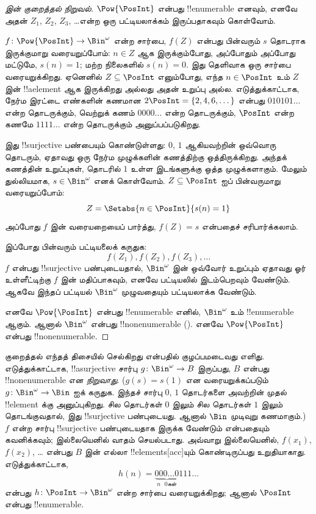 \documentclass[../../../include/open-logic-section]{subfiles}
\begin{document}
\begin{proof}[{} இன் குறைத்தல் நிறுவல்]
$\Pow{\PosInt}$ என்பது !!{enumerable} எனவும், எனவே அதன்
$Z_{1}$, $Z_{2}$, $Z_{3}$, \dots என்ற ஒரு பட்டியலாக்கம்
இருப்பதாகவும் கொள்வோம்.

$f \colon \Pow{\PosInt} \to \Bin^\omega$ என்ற சார்பை,
$f(Z)$ என்பது பின்வரும் $s$ தொடராக இருக்குமாறு வரையறுப்போம்:
$n \in Z$ ஆக இருக்கும்போது, அப்போதும் அப்போது மட்டுமே,
$s(n) = 1$; மற்ற நிலைகளில் $s(n) = 0$.
இது தெளிவாக ஒரு சார்பை வரையறுக்கிறது.
ஏனெனில் $Z \subseteq \PosInt$ எனும்போது,
எந்த $n \in \PosInt$ உம் $Z$ இன் !!a{element} ஆக இருக்கிறது
அல்லது அதன் உறுப்பு அல்ல.
எடுத்துக்காட்டாக, நேர்ம இரட்டை எண்களின் கணமான
$2\PosInt = \{2,
4, 6, \dots\}$ என்பது $010101\dots$ என்ற தொடருக்கும்,
வெற்றுக் கணம் $0000\dots$ என்ற தொடருக்கும்,
$\PosInt$ என்ற கணமே $1111\dots$ என்ற தொடருக்கும் அனுப்பப்படுகிறது.

இது !!{surjective} பண்பையும் கொண்டுள்ளது:
$0$, $1$ ஆகியவற்றின் ஒவ்வொரு தொடரும், ஏதாவது ஒரு நேர்ம முழுக்களின்
கணத்திற்கு ஒத்திருக்கிறது.
அந்தக் கணத்தின் உறுப்புகள், தொடரில் $1$ உள்ள இடங்களுக்கு
ஒத்த முழுக்களாகும்.
மேலும் துல்லியமாக, $s \in \Bin^\omega$ எனக் கொள்வோம்.
$Z \subseteq \PosInt$ ஐப் பின்வருமாறு வரையறுப்போம்:
\[
Z = \Setabs{n \in \PosInt}{s(n) = 1}
\]
அப்போது $f$ இன் வரையறையைப் பார்த்து,
$f(Z) = s$ என்பதைச் சரிபார்க்கலாம்.

இப்போது பின்வரும் பட்டியலைக் கருதுக:
\[
f(Z_1), f(Z_2), f(Z_3), \dots
\]
$f$ என்பது !!{surjective} பண்புடையதால்,
$\Bin^\omega$ இன் ஒவ்வோர் உறுப்பும் ஏதாவது ஓர் உள்ளீட்டிற்கு
$f$ இன் மதிப்பாகவும், எனவே பட்டியலில் இடம்பெறவும் வேண்டும்.
ஆகவே இந்தப் பட்டியல் $\Bin^\omega$ முழுவதையும் பட்டியலாக்க வேண்டும்.

எனவே $\Pow{\PosInt}$ என்பது !!{enumerable} எனில்,
$\Bin^\omega$ உம் !!{enumerable} ஆகும்.
ஆனால் $\Bin^\omega$ என்பது !!{nonenumerable}
().
எனவே $\Pow{\PosInt}$ என்பது !!{nonenumerable}.
\end{proof}

\begin{explain}
குறைத்தல் எந்தத் திசையில் செல்கிறது என்பதில் குழப்பமடைவது எளிது.
எடுத்துக்காட்டாக, !!a{surjective} சார்பு
$g \colon \Bin^\omega \to B$ இருப்பது,
$B$ என்பது !!{nonenumerable} என \emph{நிறுவாது}.
($g(s) = s(1)$ என வரையறுக்கப்படும்
$g \colon \Bin^\omega \to \Bin$ ஐக் கருதுக.
இந்தச் சார்பு $0$, $1$ தொடர்களை அவற்றின் முதல் !!{element} க்கு
அனுப்புகிறது.
சில தொடர்கள் $0$ இலும் சில தொடர்கள் $1$ இலும் தொடங்குவதால்,
இது !!{surjective} பண்புடையது.
ஆனால் $\Bin$ முடிவுறு கணமாகும்.)
$f$ என்ற சார்பு !!{surjective} பண்புடையதாக இருக்க வேண்டும்
என்பதையும் கவனிக்கவும்; இல்லையெனில் வாதம் செயல்படாது.
அவ்வாறு இல்லையெனில், $f(x_1)$, $f(x_2)$, \dots{} என்பது
$B$ இன் எல்லா !!{element}s[acc]யும் கொண்டிருப்பது உறுதியாகாது.
எடுத்துக்காட்டாக,
\[
h(n) = \underbrace{000\dots0}_{\text{$n$ $0$கள்}}111\dots
\]
என்பது $h\colon \PosInt \to
\Bin^\omega$ என்ற சார்பை வரையறுக்கிறது;
ஆனால் $\PosInt$ என்பது !!{enumerable}.
\end{explain}
\end{document}
